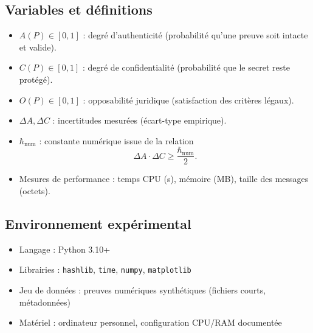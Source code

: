 \documentclass[12pt,a4paper]{report}
\begin{document}
{	\subsection*{Variables et définitions}
	\begin{itemize}
		\item $A(P) \in [0,1]$ : degré d’authenticité (probabilité qu’une preuve soit intacte et valide).
		\item $C(P) \in [0,1]$ : degré de confidentialité (probabilité que le secret reste protégé).
		\item $O(P) \in [0,1]$ : opposabilité juridique (satisfaction des critères légaux).
		\item $\Delta A, \Delta C$ : incertitudes mesurées (écart-type empirique).
		\item $\hbar_{\text{num}}$ : constante numérique issue de la relation 
		\[
		\Delta A \cdot \Delta C \geq \frac{\hbar_{\text{num}}}{2}.
		\]
		\item Mesures de performance : temps CPU (s), mémoire (MB), taille des messages (octets).
	\end{itemize}
	
	\subsection*{Environnement expérimental}
	\begin{itemize}
		\item Langage : Python 3.10+
		\item Librairies : \texttt{hashlib}, \texttt{time}, \texttt{numpy}, \texttt{matplotlib}
		\item Jeu de données : preuves numériques synthétiques (fichiers courts, métadonnées)
		\item Matériel : ordinateur personnel, configuration CPU/RAM documentée
	\end{itemize}
	
}
\end{document}
